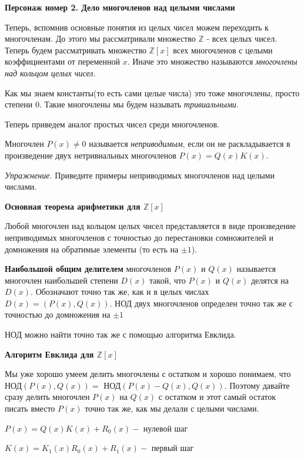 \newpage

\hspace{3mm}

\textbf{\large \bf Персонаж номер 2. Дело многочленов над целыми числами}

Теперь, вспомнив основные понятия из целых чисел можем переходить к многочленам. До этого мы рассматривали множество $\mathbb{Z}$ - всех целых чисел. Теперь будем рассматривать множество $\mathbb{Z}[x]$ всех многочленов с целыми коэффициентами от переменной $x$. Иначе это множество называются \textit{многочлены над кольцом целых чисел.}

Как мы знаем константы(то есть сами целые числа) это тоже многочлены, просто степени 0. Такие многочлены мы будем называть \textit{тривиальными}.

Теперь приведем аналог простых чисел среди многочленов.

Многочлен $P(x)\neq 0$ называется \textit{неприводимым}, если он не раскладывается в произведение двух нетривиальных многочленов $P(x) = Q(x)K(x)$.

\textit{Упражнение.} Приведите примеры неприводимых многочленов над целыми числами.

\textbf{Основная теорема арифметики для $\mathbb{Z}[x]$}

Любой многочлен над кольцом целых чисел представляется в виде произведение неприводимых многочленов с точностью до перестановки сомножителей и домножения на обратимые элементы (то есть на $\pm 1$).

\textbf{Наибольшой общим делителем} многочленов $P(x)$ и $Q(x)$ называется многочлен наибольшей степени $D(x)$ такой, что $P(x)$ и $Q(x)$ делятся на $D(x)$. Обозначают точно так же, как и в целых числах $D(x) = (P(x), Q(x))$. НОД двух многочленов определен точно так же с точностью до домножения на $\pm 1$

НОД можно найти точно так же с помощью алгоритма Евклида.

\textbf{Алгоритм Евклида для $\mathbb{Z}[x]$}


Мы уже хорошо умеем делить многочлены с остатком и хорошо понимаем, что НОД$(P(x), Q(x)) = $ НОД$(P(x) - Q(x), Q(x))$. Поэтому давайте сразу делить многочлен $P(x)$ на $Q(x)$ с остатком и этот самый остаток писать вместо $P(x)$ точно так же, как мы делали с целыми числами.

\centerline{$P(x) = Q(x)K(x)+R_0(x) -$ нулевой шаг}

\centerline{$K(x) = K_1(x)R_0(x) + R_1(x) -$ первый шаг}

